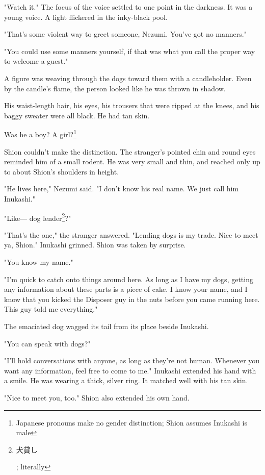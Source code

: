 "Watch it." The focus of the voice settled to one point in the darkness.
It was a young voice. A light flickered in the inky-black pool.

"That's some violent way to greet someone, Nezumi. You've got no
manners."

"You could use some manners yourself, if that was what you call the
proper way to welcome a guest."

A figure was weaving through the dogs toward them with a candleholder.
Even by the candle's flame, the person looked like he was thrown in
shadow.

His waist-length hair, his eyes, his trousers that were ripped at the
knees, and his baggy sweater were all black. He had tan skin.

Was he a boy? A girl?\footnote{Japanese pronouns make no gender distinction; Shion assumes Inukashi is male}

Shion couldn't make the distinction. The stranger's pointed chin and
round eyes reminded him of a small rodent. He was very small and thin,
and reached only up to about Shion's shoulders in height.

"He lives here," Nezumi said. "I don't know his real name. We just call
him Inukashi."

"Like― dog lender\footnote{\begin{CJK}{UTF8}{min}犬貸し\end{CJK}; literally}?"

"That's the one," the stranger answered. "Lending dogs is my trade. Nice
to meet ya, Shion." Inukashi grinned. Shion was taken by surprise.

"You know my name."

"I'm quick to catch onto things around here. As long as I have my dogs,
getting any information about these parts is a piece of cake. I know
your name, and I know that you kicked the Disposer guy in the nuts
before you came running here. This guy told me everything."

The emaciated dog wagged its tail from its place beside Inukashi.

"You can speak with dogs?"

"I'll hold conversations with anyone, as long as they're not human.
Whenever you want any information, feel free to come to me." Inukashi
extended his hand with a smile. He was wearing a thick, silver ring. It
matched well with his tan skin.

"Nice to meet you, too." Shion also extended his own hand.

